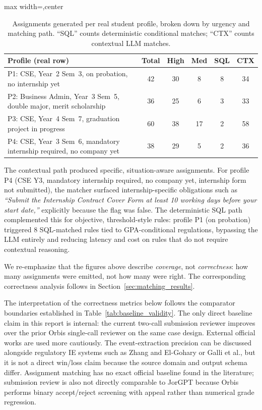 \documentclass[a4paper,12pt]{article}
\renewcommand{\texttt}[1]{{\ttfamily\seqsplit{#1}}}
\begin{document}
\begin{table}[H]
    \centering
    \begin{adjustbox}{max width=\linewidth,center}
        \begin{tabular}{p{6.2cm} c c c c c}
            \toprule
            \textbf{Profile (real \texttt{user\_profiles} row)} & \textbf{Total} & \textbf{High} & \textbf{Med} & \textbf{SQL} & \textbf{CTX} \\ \midrule
            P1: CSE, Year~2 Sem~3, on probation, no internship yet & 42 & 30 & 8 & 8 & 34 \\
            P2: Business Admin, Year~3 Sem~5, double major, merit scholarship & 36 & 25 & 6 & 3 & 33 \\
            P3: CSE, Year~4 Sem~7, graduation project in progress & 60 & 38 & 17 & 2 & 58 \\
            P4: CSE, Year~3 Sem~6, mandatory internship required, no company yet & 38 & 29 & 5 & 2 & 36 \\
            \bottomrule
        \end{tabular}
    \end{adjustbox}
    \caption[Assignments per Student Profile]{Assignments generated per real student profile, broken down by urgency and matching path. ``SQL'' counts deterministic conditional matches; ``CTX'' counts contextual LLM matches.}
    \label{tab:assignment_results}
\end{table}

The contextual path produced specific, situation-aware assignments. For profile P4 (CSE Y3, mandatory internship required, no company yet, internship form not submitted), the matcher surfaced internship-specific obligations such as \emph{``Submit the Internship Contract Cover Form at least 10 working days before your start date,''} explicitly because the \texttt{internship\_form\_submitted} flag was false. The deterministic SQL path complemented this for objective, threshold-style rules: profile P1 (on probation) triggered 8 SQL-matched rules tied to GPA-conditional regulations, bypassing the LLM entirely and reducing latency and cost on rules that do not require contextual reasoning.

We re-emphasize that the figures above describe \emph{coverage}, not \emph{correctness}: how many assignments were emitted, not how many were right. The corresponding correctness analysis follows in Section~\ref{sec:matching_results}.

The interpretation of the correctness metrics below follows the comparator boundaries established in Table~\ref{tab:baseline_validity}. The only direct baseline claim in this report is internal: the current two-call submission reviewer improves over the prior Orbis single-call reviewer on the same case design. External official works are used more cautiously. The event-extraction precision can be discussed alongside regulatory IE systems such as Zhang and El-Gohary or Galli et al., but it is not a direct win/loss claim because the source domain and output schema differ. Assignment matching has no exact official baseline found in the literature; submission review is also not directly comparable to JorGPT because Orbis performs binary accept/reject screening with appeal rather than numerical grade regression.
\end{document}
